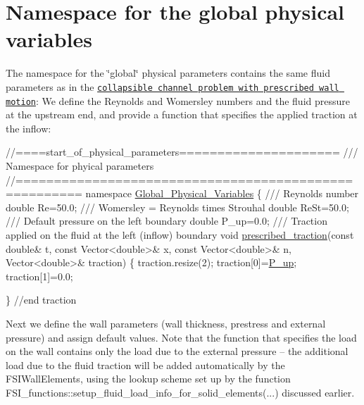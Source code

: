  

\hypertarget{index_variables}{}\section{Namespace for the global physical variables}\label{index_variables}
The namespace for the \char`\"{}global\char`\"{} physical parameters contains the same fluid parameters as in the \href{../../../navier_stokes/collapsible_channel/html/index.html}{\tt collapsible channel problem with prescribed wall motion}\+: We define the Reynolds and Womersley numbers and the fluid pressure at the upstream end, and provide a function that specifies the applied traction at the inflow\+:

 
\begin{DoxyCodeInclude}
\textcolor{comment}{//====start\_of\_physical\_parameters=====================}
\textcolor{comment}{/// Namespace for phyical parameters}
\textcolor{comment}{}\textcolor{comment}{//======================================================}
\textcolor{keyword}{namespace }\hyperlink{namespaceGlobal__Physical__Variables}{Global\_Physical\_Variables}
\{\textcolor{comment}{}
\textcolor{comment}{ /// Reynolds number}
\textcolor{comment}{} \textcolor{keywordtype}{double} Re=50.0;
\textcolor{comment}{}
\textcolor{comment}{ /// Womersley = Reynolds times Strouhal}
\textcolor{comment}{} \textcolor{keywordtype}{double} ReSt=50.0;
 \textcolor{comment}{}
\textcolor{comment}{ /// Default pressure on the left boundary}
\textcolor{comment}{} \textcolor{keywordtype}{double} P\_up=0.0;
\textcolor{comment}{}
\textcolor{comment}{ /// Traction applied on the fluid at the left (inflow) boundary}
\textcolor{comment}{} \textcolor{keywordtype}{void} \hyperlink{namespaceGlobal__Physical__Variables_a0de42ee6d39e85c77c16a04c3a05f7a2}{prescribed\_traction}(\textcolor{keyword}{const} \textcolor{keywordtype}{double}& t,
                          \textcolor{keyword}{const} Vector<double>& x,
                          \textcolor{keyword}{const} Vector<double>& n,
                          Vector<double>& traction)
 \{
  traction.resize(2);
  traction[0]=\hyperlink{namespaceGlobal__Physical__Variables_ae1a493695b7f4619af32f405b0b28861}{P\_up};
  traction[1]=0.0;

 \} \textcolor{comment}{//end traction}

\end{DoxyCodeInclude}


Next we define the wall parameters (wall thickness, prestress and external pressure) and assign default values. Note that the function that specifies the load on the wall contains only the load due to the external pressure -- the additional load due to the fluid traction will be added automatically by the {\ttfamily F\+S\+I\+Wall\+Elements}, using the lookup scheme set up by the function {\ttfamily F\+S\+I\+\_\+functions\+::setup\+\_\+fluid\+\_\+load\+\_\+info\+\_\+for\+\_\+solid\+\_\+elements}(...) discussed earlier.


